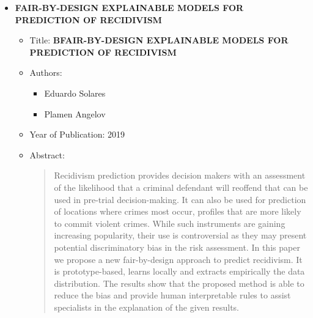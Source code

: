 \documentclass{article}
\begin{document}
\begin{itemize}
        
        \item \textbf{FAIR-BY-DESIGN EXPLAINABLE MODELS FOR PREDICTION OF
        RECIDIVISM}
        \begin{itemize}
            \item Title: \textbf{BFAIR-BY-DESIGN EXPLAINABLE MODELS FOR PREDICTION OF
            RECIDIVISM}
            \item Authors:
            \begin{itemize}
                \item Eduardo Solares
                \item Plamen Angelov
            \end{itemize}
            \item Year of Publication: 2019
            \item Abstract:
            \begin{abstract}
                Recidivism prediction provides decision makers with an assessment of the likelihood that a criminal
                defendant will reoffend that can be used in pre-trial decision-making. It can also be used for prediction
                of locations where crimes most occur, profiles that are more likely to commit violent crimes. While
                such instruments are gaining increasing popularity, their use is controversial as they may present
                potential discriminatory bias in the risk assessment. In this paper we propose a new fair-by-design
                approach to predict recidivism. It is prototype-based, learns locally and extracts empirically the data
                distribution. The results show that the proposed method is able to reduce the bias and provide human
                interpretable rules to assist specialists in the explanation of the given results.
            \end{abstract}
        \end{itemize}
        

\end{itemize}
\end{document}
